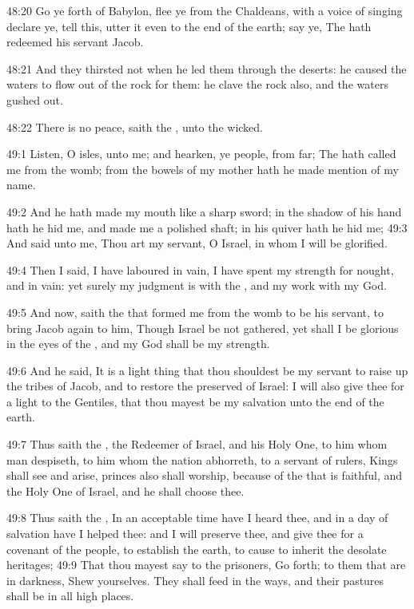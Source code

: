48:20 Go ye forth of Babylon, flee ye from the Chaldeans, with a voice of singing declare ye, tell this, utter it even to the end of the earth; say ye, The \LORD hath redeemed his servant Jacob.

48:21 And they thirsted not when he led them through the deserts: he caused the waters to flow out of the rock for them: he clave the rock also, and the waters gushed out.

48:22 There is no peace, saith the \LORD, unto the wicked.

49:1 Listen, O isles, unto me; and hearken, ye people, from far; The \LORD hath called me from the womb; from the bowels of my mother hath he made mention of my name.

49:2 And he hath made my mouth like a sharp sword; in the shadow of his hand hath he hid me, and made me a polished shaft; in his quiver hath he hid me; 49:3 And said unto me, Thou art my servant, O Israel, in whom I will be glorified.

49:4 Then I said, I have laboured in vain, I have spent my strength for nought, and in vain: yet surely my judgment is with the \LORD, and my work with my God.

49:5 And now, saith the \LORD that formed me from the womb to be his servant, to bring Jacob again to him, Though Israel be not gathered, yet shall I be glorious in the eyes of the \LORD, and my God shall be my strength.

49:6 And he said, It is a light thing that thou shouldest be my servant to raise up the tribes of Jacob, and to restore the preserved of Israel: I will also give thee for a light to the Gentiles, that thou mayest be my salvation unto the end of the earth.

49:7 Thus saith the \LORD, the Redeemer of Israel, and his Holy One, to him whom man despiseth, to him whom the nation abhorreth, to a servant of rulers, Kings shall see and arise, princes also shall worship, because of the \LORD that is faithful, and the Holy One of Israel, and he shall choose thee.

49:8 Thus saith the \LORD, In an acceptable time have I heard thee, and in a day of salvation have I helped thee: and I will preserve thee, and give thee for a covenant of the people, to establish the earth, to cause to inherit the desolate heritages; 49:9 That thou mayest say to the prisoners, Go forth; to them that are in darkness, Shew yourselves. They shall feed in the ways, and their pastures shall be in all high places.

